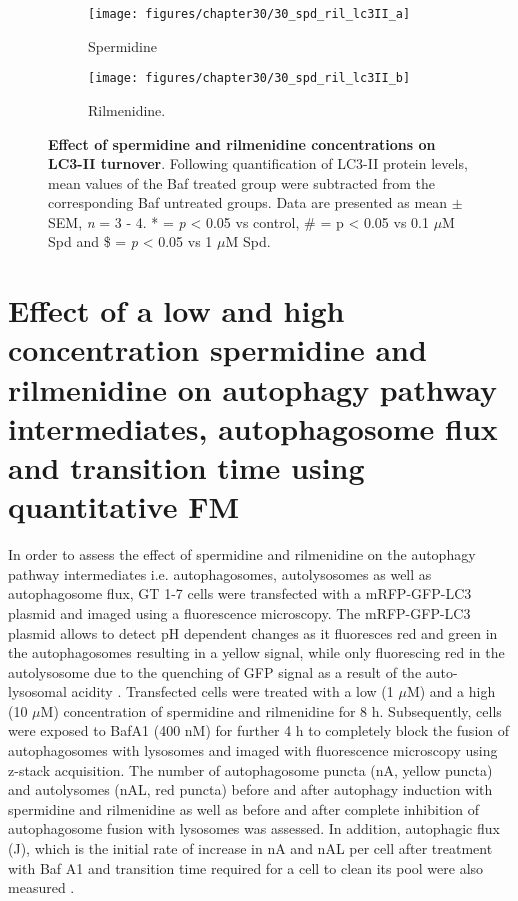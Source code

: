 {\begin{figure}[!htbp]
  \centering
  \begin{subfigure}[b]{0.495\linewidth}
    \texttt{[image: figures/chapter30/30\_spd\_ril\_lc3II\_a]}
    \caption{Spermidine}
  \end{subfigure}
  \begin{subfigure}[b]{0.495\linewidth}
    \texttt{[image: figures/chapter30/30\_spd\_ril\_lc3II\_b]}
    \caption{Rilmenidine.}
  \end{subfigure}
  \caption[Effect of spermidine and rilmenidine concentrations on LC3-II turnover]{\textbf{Effect of spermidine and rilmenidine concentrations on LC3-II turnover}. Following quantification of LC3-II protein levels, mean values of the Baf treated group were subtracted from the corresponding Baf untreated groups. Data are presented as mean $\pm$ SEM, \textit{n} = 3 - 4. * = \textit{p} < 0.05 vs control, \# = p < 0.05 vs 0.1 $\mu$M Spd and \$ = \textit{p} < 0.05 vs 1 $\mu$M Spd.}
  \label{fig:30_spd_ril_lc3ii}
\end{figure}

\section{Effect of a low and high concentration spermidine and rilmenidine on autophagy pathway intermediates, autophagosome flux and transition time using quantitative FM}
In order to assess the effect of spermidine and rilmenidine on the autophagy pathway intermediates i.e. autophagosomes, autolysosomes as well as autophagosome flux, GT 1-7 cells were transfected with a mRFP-GFP-LC3 plasmid \citep{yoshii2017} and imaged using a fluorescence microscopy. The mRFP-GFP-LC3 plasmid allows to detect pH dependent changes as it fluoresces red and green in the autophagosomes resulting in a yellow signal, while only fluorescing red in the autolysosome due to the quenching of GFP signal as a result of the auto-lysosomal acidity \citep{yoshii2017}. Transfected cells were treated with a low (1 $\mu$M) and a high (10 $\mu$M) concentration of spermidine and rilmenidine for 8 h. Subsequently, cells were exposed to BafA1 (400 nM) for further 4 h to completely block the fusion of autophagosomes with lysosomes \citep{DuToit2018b} and imaged with fluorescence microscopy using z-stack acquisition. The number of autophagosome puncta (nA, yellow puncta) and autolysomes (nAL, red puncta) before and after autophagy induction with spermidine and rilmenidine as well as before and after complete inhibition of autophagosome fusion with lysosomes was assessed. In addition, autophagic flux (J), which is the initial rate of increase in nA and nAL per cell after treatment with Baf A1 and transition time required for a cell to clean its pool were also measured \citep{DuToit2018a,DuToit2018b,loos2014}.

}
